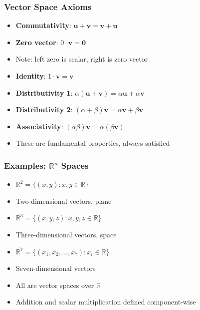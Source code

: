 \begin{frame}[fragile]\frametitle{Vector Space Axioms}
  \begin{itemize}
    \item \textbf{Commutativity}: $\mathbf{u} + \mathbf{v} = \mathbf{v} + \mathbf{u}$
    \item \textbf{Zero vector}: $0 \cdot \mathbf{v} = \mathbf{0}$
    \item Note: left zero is scalar, right is zero vector
    \item \textbf{Identity}: $1 \cdot \mathbf{v} = \mathbf{v}$
    \item \textbf{Distributivity 1}: $\alpha(\mathbf{u} + \mathbf{v}) = \alpha\mathbf{u} + \alpha\mathbf{v}$
    \item \textbf{Distributivity 2}: $(\alpha + \beta)\mathbf{v} = \alpha\mathbf{v} + \beta\mathbf{v}$
    \item \textbf{Associativity}: $(\alpha\beta)\mathbf{v} = \alpha(\beta\mathbf{v})$
    \item These are fundamental properties, always satisfied
  \end{itemize}
\end{frame}

\begin{frame}[fragile]\frametitle{Examples: $\mathbb{R}^n$ Spaces}
  \begin{itemize}
    \item $\mathbb{R}^2 = \{(x,y) : x,y \in \mathbb{R}\}$
    \item Two-dimensional vectors, plane
    \item $\mathbb{R}^3 = \{(x,y,z) : x,y,z \in \mathbb{R}\}$
    \item Three-dimensional vectors, space
    \item $\mathbb{R}^7 = \{(x_1, x_2, \ldots, x_7) : x_i \in \mathbb{R}\}$
    \item Seven-dimensional vectors
    \item All are vector spaces over $\mathbb{R}$
    \item Addition and scalar multiplication defined component-wise
  \end{itemize}
\end{frame}

